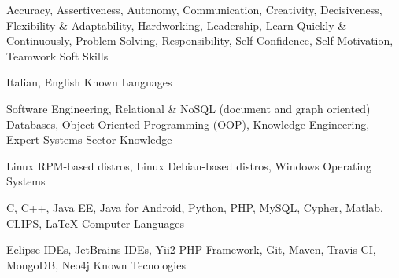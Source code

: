 

\begin{cventries}

  \cventry
      {Accuracy, Assertiveness, Autonomy, Communication, Creativity, Decisiveness, Flexibility \& Adaptability, Hardworking, Leadership, Learn Quickly \& Continuously, Problem Solving, Responsibility, Self-Confidence, Self-Motivation, Teamwork}
    {Soft Skills}
    {}
    {}
    {}

  \cventry
    {Italian, English}
    {Known Languages}
    {}
    {}
    {}

  \cventry
    {Software Engineering, Relational \& NoSQL (document and graph oriented) Databases, Object-Oriented Programming (OOP), Knowledge Engineering, Expert Systems}
    {Sector Knowledge}
    {}
    {}
    {}

  \cventry
    {Linux RPM-based distros, Linux Debian-based distros, Windows}
    {Operating Systems}
    {}
    {}
    {}

  \cventry
    {C, C++, Java EE, Java for Android, Python, PHP, MySQL, Cypher, Matlab, CLIPS, LaTeX}
    {Computer Languages}
    {}
    {}
    {}

  \cventry
    {Eclipse IDEs, JetBrains IDEs, Yii2 PHP Framework, Git, Maven, Travis CI, MongoDB, Neo4j}
    {Known Tecnologies}
    {}
    {}
    {}

\end{cventries}

